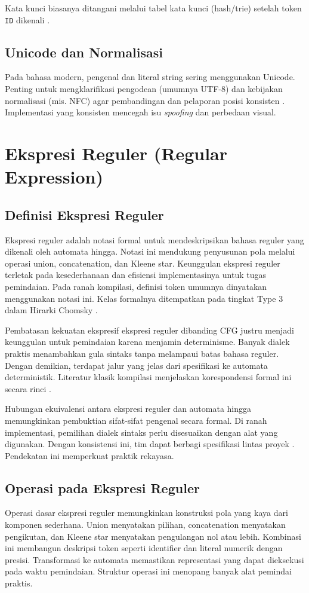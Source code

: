\documentclass[../main.tex]{subfiles}
\begin{document}
Kata kunci biasanya ditangani melalui tabel kata kunci (hash/trie) setelah token \texttt{ID} dikenali \citep{WikiTrie,WikiHashTable}.

\subsection{Unicode dan Normalisasi}
Pada bahasa modern, pengenal dan literal string sering menggunakan Unicode. Penting untuk mengklarifikasi pengodean (umumnya UTF-8) dan kebijakan normalisasi (mis. NFC) agar pembandingan dan pelaporan posisi konsisten \citep{WikiUnicode,WikiUTF8,UnicodeUAX15,UnicodeUAX29}. Implementasi yang konsisten mencegah isu \emph{spoofing} dan perbedaan visual.

\section{Ekspresi Reguler (Regular Expression)}
\subsection{Definisi Ekspresi Reguler}
Ekspresi reguler adalah notasi formal untuk mendeskripsikan bahasa reguler yang dikenali oleh automata hingga. Notasi ini mendukung penyusunan pola melalui operasi union, concatenation, dan Kleene star. Keunggulan ekspresi reguler terletak pada kesederhanaan dan efisiensi implementasinya untuk tugas pemindaian. Pada ranah kompilasi, definisi token umumnya dinyatakan menggunakan notasi ini. Kelas formalnya ditempatkan pada tingkat Type 3 dalam Hirarki Chomsky \citep{WikiRegex,WikiChomsky}.

Pembatasan kekuatan ekspresif ekspresi reguler dibanding CFG justru menjadi keunggulan untuk pemindaian karena menjamin determinisme. Banyak dialek praktis menambahkan gula sintaks tanpa melampaui batas bahasa reguler. Dengan demikian, terdapat jalur yang jelas dari spesifikasi ke automata deterministik. Literatur klasik kompilasi menjelaskan korespondensi formal ini secara rinci \citep{Mogensen2010}.

Hubungan ekuivalensi antara ekspresi reguler dan automata hingga memungkinkan pembuktian sifat-sifat pengenal secara formal. Di ranah implementasi, pemilihan dialek sintaks perlu disesuaikan dengan alat yang digunakan. Dengan konsistensi ini, tim dapat berbagi spesifikasi lintas proyek \citep{WikiRegex}. Pendekatan ini memperkuat praktik rekayasa.

\subsection{Operasi pada Ekspresi Reguler}
Operasi dasar ekspresi reguler memungkinkan konstruksi pola yang kaya dari komponen sederhana. Union menyatakan pilihan, concatenation menyatakan pengikutan, dan Kleene star menyatakan pengulangan nol atau lebih. Kombinasi ini membangun deskripsi token seperti identifier dan literal numerik dengan presisi. Transformasi ke automata memastikan representasi yang dapat dieksekusi pada waktu pemindaian. Struktur operasi ini menopang banyak alat pemindai praktis.
\end{document}

